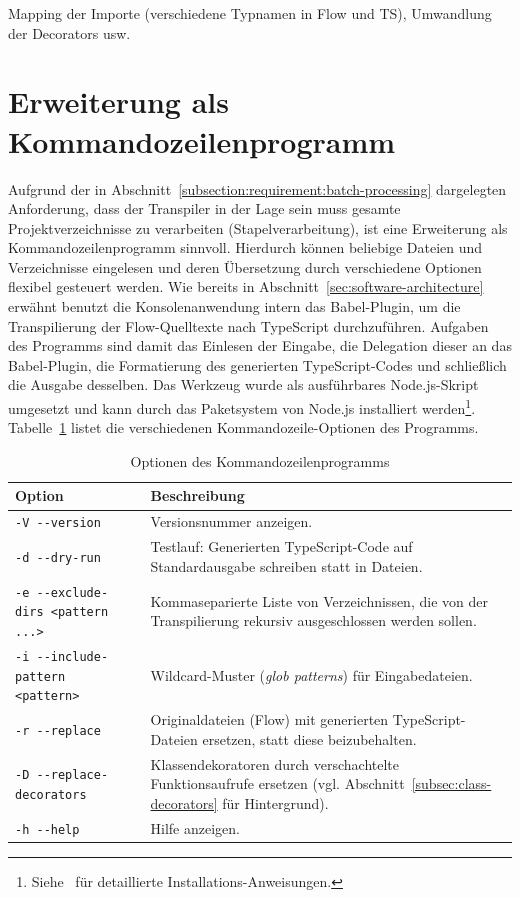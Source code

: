 Mapping der Importe (verschiedene Typnamen in Flow und TS), Umwandlung der Decorators usw.

\section{Erweiterung als Kommandozeilenprogramm}

Aufgrund der in Abschnitt~\ref{subsection:requirement:batch-processing} dargelegten Anforderung, dass der Transpiler in der Lage sein muss gesamte Projektverzeichnisse zu verarbeiten (Stapelverarbeitung), ist eine Erweiterung als Kommandozeilenprogramm sinnvoll. Hierdurch können beliebige Dateien und Verzeichnisse eingelesen und deren Übersetzung durch verschiedene Optionen flexibel gesteuert werden. Wie bereits in Abschnitt~\ref{sec:software-architecture} erwähnt benutzt die Konsolenanwendung intern das Babel-Plugin, um die Transpilierung der Flow-Quelltexte nach TypeScript durchzuführen. Aufgaben des Programms sind damit das Einlesen der Eingabe, die Delegation dieser an das Babel-Plugin, die Formatierung des generierten TypeScript-Codes und schließlich die Ausgabe desselben.
Das Werkzeug wurde als ausführbares Node.js-Skript umgesetzt und kann durch das Paketsystem von Node.js installiert werden\footnote{Siehe~\autocite{REFLOW_GITHUB} für detaillierte Installations-Anweisungen.}. Tabelle~\ref{tab:cli-options} listet die verschiedenen Kommandozeile-Optionen des Programms.

\bigskip
\begin{table}[tbh]
  \small
  \begin{tabularx}{\textwidth}{@{}lX@{}}
    \midrule
    \textbf{Option} & \textbf{Beschreibung} \\
    \midrule
    \smallskip
    \texttt{-V -{}-version} & Versionsnummer anzeigen. \\
    \smallskip
    \texttt{-d -{}-dry-run} & Testlauf: Generierten TypeScript-Code auf Standardausgabe schreiben statt in Dateien.\\
    \smallskip
    \texttt{-e -{}-exclude-dirs <pattern ...>} & Kommaseparierte Liste von Verzeichnissen, die von der Transpilierung rekursiv ausgeschlossen werden sollen. \\
    \smallskip
    \texttt{-i -{}-include-pattern <pattern>} & Wildcard-Muster (\textit{glob patterns}) für Eingabedateien. \\
    \smallskip
    \texttt{-r -{}-replace} & Originaldateien (Flow) mit generierten TypeScript-Dateien ersetzen, statt diese beizubehalten. \\
    \smallskip
    \texttt{-D -{}-replace-decorators} & Klassendekoratoren durch verschachtelte Funktionsaufrufe ersetzen (vgl. Abschnitt~\ref{subsec:class-decorators} für Hintergrund). \\
    \smallskip
    \texttt{-h -{}-help} & Hilfe anzeigen. \\
    \midrule
  \end{tabularx}
  \caption{Optionen des Kommandozeilenprogramms}
  \label{tab:cli-options}
\end{table}

